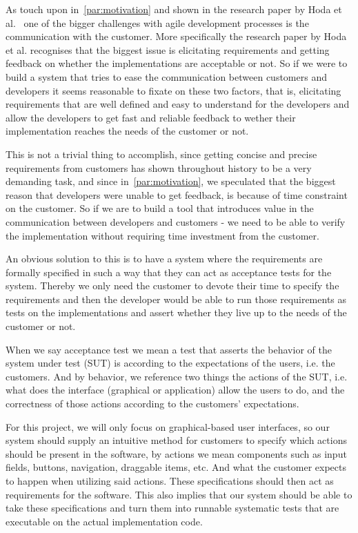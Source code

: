 As touch upon in~\autoref{par:motivation} and shown in the research paper by Hoda et al.~\cite{Hoda2011TheIO} one of the bigger challenges with agile development processes is the communication with the customer.
More specifically the research paper by Hoda et al. recognises that the biggest issue is elicitating requirements and getting feedback on whether the implementations are acceptable or not.
So if we were to build a system that tries to ease the communication between customers and developers it seems reasonable to fixate on these two factors, that is, elicitating requirements that are well defined and easy to understand for the developers and allow the developers to get fast and reliable feedback to wether their implementation reaches the needs of the customer or not.

This is not a trivial thing to accomplish, since getting concise and precise requirements from customers has shown throughout history to be a very demanding task, and since in~\autoref{par:motivation}, we speculated that the biggest reason that developers were unable to get feedback, is because of time constraint on the customer.
So if we are to build a tool that introduces value in the communication between developers and customers - we need to be able to verify the implementation without requiring time investment from the customer.

An obvious solution to this is to have a system where the requirements are formally specified in such a way that they can act as acceptance tests for the system.
Thereby we only need the customer to devote their time to specify the requirements and then the developer would be able to run those requirements as tests on the implementations and assert whether they live up to the needs of the customer or not.

When we say acceptance test we mean a test that asserts the behavior of the system under test (SUT) is according to the expectations of the users, i.e. the customers.
And by behavior, we reference two things the actions of the SUT, i.e. what does the interface (graphical or application) allow the users to do, and the correctness of those actions according to the customers' expectations.

For this project, we will only focus on graphical-based user interfaces, so our system should supply an intuitive method for customers to specify which actions should be present in the software, by actions we mean components such as input fields, buttons, navigation, draggable items, etc.
And what the customer expects to happen when utilizing said actions.
These specifications should then act as requirements for the software.
This also implies that our system should be able to take these specifications and turn them into runnable systematic tests that are executable on the actual implementation code.

